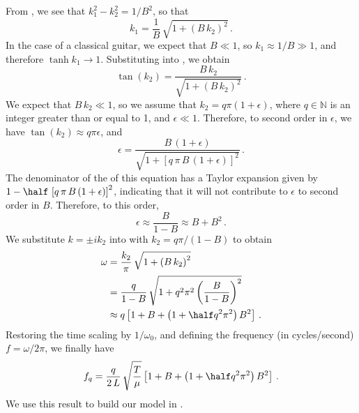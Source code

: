 From , we see that $k_1^2 - k_2^2 = 1/B^2$, so that
 \begin{equation} \label{eqn:k1k2}
k_1 = \frac{1}{B}\, \sqrt{1 + \left(B\, k_2\right)^2}\, .
 \end{equation}
In the case of a classical guitar, we expect that $B \ll 1$, so $k_1 \approx 1/B \gg 1$, and therefore $\tanh{k_1} \longrightarrow 1$. Substituting  into , we obtain
 \begin{equation} \label{eqn:tran_eqn_2}
\tan(k_2) = \frac{B\, k_2}{ \sqrt{1 + \left(B\, k_2\right)^2}}\, .
 \end{equation}
We expect that $B\, k_2 \ll 1$, so we assume that $k_2 = q \pi (1 + \epsilon)$, where $q \in \mathbb{N}$ is an integer greater than or equal to 1, and $\epsilon \ll 1$. Therefore, to second order in $\epsilon$, we have $\tan(k_2) \approx q \pi \epsilon$, and
 \begin{equation}
\epsilon = \frac{B\, (1 + \epsilon)}{\sqrt{1 + \left[q\, \pi\, B\, (1 + \epsilon)\right]^2}}\, .
 \end{equation}
The denominator of the \rhs of this equation has a Taylor expansion given by $1 - \half\, \left[q\, \pi\, B\, (1 + \epsilon)\right]^2$, indicating that it will not contribute to $\epsilon$ to second order in $B$. Therefore, to this order,
 \begin{equation}%
\epsilon \approx \frac{B}{1 - B} \approx B + B^2\, .
 \end{equation}
We substitute $k = \pm i k_2$ into  with $k_2 = q \pi/(1 - B)$ to obtain
 \begin{equation}
 \begin{split}
\omega &= \frac{k_2}{\pi}\, \sqrt{1 + \left(B\, k_2\right)^2} \\
&= \frac{q}{1 - B}\, \sqrt{1 + q^2 \pi^2 \left(\frac{B}{1 - B}\right)^2} \\
&\approx q \left[ 1 + B + \left( 1 + \half q^2 \pi^2 \right) B^2 \right]\, .
 \end{split}
 \end{equation}
Restoring the time scaling by $1/\omega_0$, and defining the frequency (in cycles/second) $f = \omega/2 \pi$, we finally have
 \begin{equation} \label{eqn:f_m_hybrid}
f_q = \frac{q}{2\, L}\, \sqrt{\frac{T}{\mu}} \left[ 1 + B + \left( 1 + \half q^2 \pi^2 \right) B^2 \right]\, .
 \end{equation}
We use this result to build our model in . 